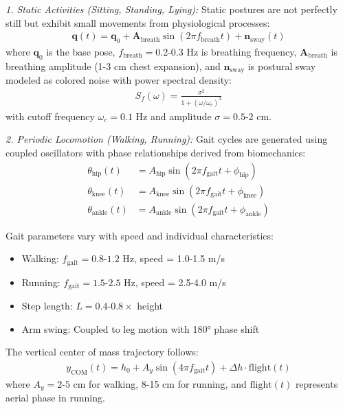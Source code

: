 \documentclass[journal]{IEEEtran}
\begin{document}
\textit{1. Static Activities (Sitting, Standing, Lying):}
Static postures are not perfectly still but exhibit small movements from physiological processes:
\begin{align}
\mathbf{q}(t) = \mathbf{q}_0 + \mathbf{A}_{\text{breath}} \sin(2\pi f_{\text{breath}} t) + \mathbf{n}_{\text{sway}}(t)
\end{align}
where $\mathbf{q}_0$ is the base pose, $f_{\text{breath}} = 0.2\text{-}0.3$ Hz is breathing frequency, $\mathbf{A}_{\text{breath}}$ is breathing amplitude (1-3 cm chest expansion), and $\mathbf{n}_{\text{sway}}$ is postural sway modeled as colored noise with power spectral density:
\begin{align}
S_f(\omega) = \frac{\sigma^2}{1 + (\omega/\omega_c)^2}
\end{align}
with cutoff frequency $\omega_c = 0.1$ Hz and amplitude $\sigma = 0.5\text{-}2$ cm.

\textit{2. Periodic Locomotion (Walking, Running):}
Gait cycles are generated using coupled oscillators with phase relationships derived from biomechanics:
\begin{align}
\theta_{\text{hip}}(t) &= A_{\text{hip}} \sin(2\pi f_{\text{gait}} t + \phi_{\text{hip}}) \\
\theta_{\text{knee}}(t) &= A_{\text{knee}} \sin(2\pi f_{\text{gait}} t + \phi_{\text{knee}}) \\
\theta_{\text{ankle}}(t) &= A_{\text{ankle}} \sin(2\pi f_{\text{gait}} t + \phi_{\text{ankle}})
\end{align}

Gait parameters vary with speed and individual characteristics:
\begin{itemize}
\item Walking: $f_{\text{gait}} = 0.8\text{-}1.2$ Hz, speed = 1.0-1.5 m/s
\item Running: $f_{\text{gait}} = 1.5\text{-}2.5$ Hz, speed = 2.5-4.0 m/s
\item Step length: $L = 0.4\text{-}0.8 \times$ height
\item Arm swing: Coupled to leg motion with 180° phase shift
\end{itemize}

The vertical center of mass trajectory follows:
\begin{align}
y_{\text{COM}}(t) = h_0 + A_y \sin(4\pi f_{\text{gait}} t) + \Delta h \cdot \text{flight}(t)
\end{align}
where $A_y = 2\text{-}5$ cm for walking, 8-15 cm for running, and $\text{flight}(t)$ represents aerial phase in running.
\end{document}
